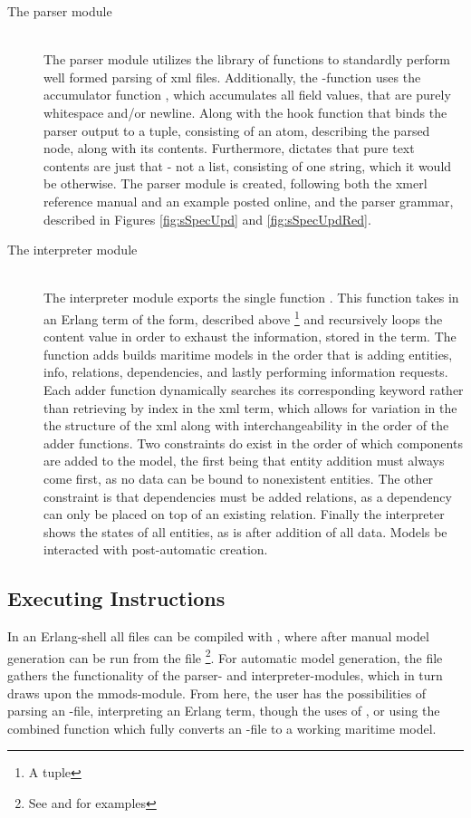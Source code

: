 \begin{description}
	\item[The parser module]\ \\
		The parser module utilizes the  library of functions to standardly perform well formed parsing of xml files. Additionally, the -function uses the accumulator function , which accumulates all field values, that are  purely whitespace and/or newline. Along with the hook function  that binds the parser output to a tuple, consisting of an atom, describing the parsed node, along with its contents. Furthermore,  dictates that pure text contents are just that - not a list, consisting of one string, which it would be otherwise. The parser module is created, following both the xmerl reference manual\cite{xmerl} and an example posted online\cite{xmerlEx}, and the parser grammar, described in Figures \ref{fig:sSpecUpd} and \ref{fig:sSpecUpdRed}.
	\item[The interpreter module]\ \\
		The interpreter module exports the single function . This function takes in an Erlang term of the form, described above \footnote{A tuple} and recursively loops the content value in order to exhaust the information, stored in the term. The  function adds builds maritime models in the order that is adding entities, info, relations, dependencies, and lastly performing information requests. Each adder function dynamically searches its corresponding keyword rather than retrieving by index in the xml term, which allows for variation in the the structure of the xml along with interchangeability in the order of the adder functions. Two constraints do exist in the order of which components are added to the model, the first being that entity addition must always come first, as no data can be bound to nonexistent entities. The other constraint is that dependencies must be added  relations, as a dependency can only be placed on top of an existing relation. Finally the interpreter shows the states of all entities, as is after addition of all data. Models  be interacted with post-automatic creation.
\end{description}
\subsection{Executing Instructions}
In an Erlang-shell all files can be compiled with , where after manual model generation can be run from the  file \footnote{See  and  for examples}.
For automatic model generation, the  file gathers the functionality of the parser- and interpreter-modules, which in turn draws upon the mmods-module. From here, the user has the possibilities of parsing an -file, interpreting an Erlang term, though the uses of ,  or using the combined function  which fully converts an -file to a working maritime model.

